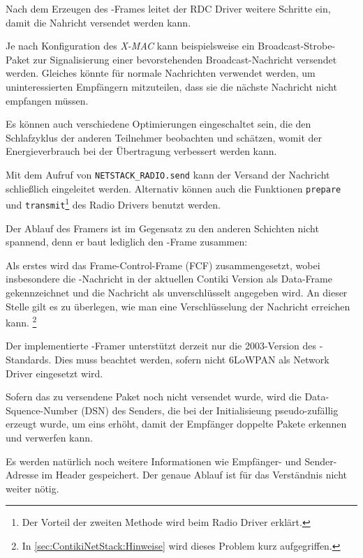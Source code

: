 \medskip

	Nach dem Erzeugen des \ieeeframe-Frames leitet der RDC Driver weitere
	Schritte ein, damit die Nahricht versendet werden kann.

	Je nach Konfiguration des \emph{X-MAC} kann beispielsweise ein
	Broadcast-Strobe-Paket zur Signalisierung einer bevorstehenden
	Broadcast-Nachricht versendet werden.  Gleiches könnte für normale
	Nachrichten verwendet werden, um uninteressierten Empfängern
	mitzuteilen, dass sie die nächste Nachricht nicht empfangen müssen.

	Es können auch verschiedene Optimierungen eingeschaltet sein, die den
	Schlafzyklus der anderen Teilnehmer beobachten und schätzen, womit der
	Energieverbrauch bei der Übertragung verbessert werden kann.

\medskip

	Mit dem Aufruf von \lstinline=NETSTACK_RADIO.send= kann der Versand der
	Nachricht schließlich eingeleitet werden.  Alternativ können auch die
	Funktionen \lstinline=prepare= und \lstinline=transmit=\footnote{Der Vorteil der
	zweiten Methode wird beim Radio Driver erklärt.} des Radio Drivers
	benutzt werden.

	Der Ablauf des Framers ist im Gegensatz zu den anderen Schichten nicht
	spannend, denn er baut lediglich den \ieeeframe-Frame zusammen:

	Als erstes wird das Frame-Control-Frame (FCF) zusammengesetzt, wobei
	insbesondere die \ieeeframe-Nachricht in der aktuellen Contiki Version
	als Data-Frame gekennzeichnet und die Nachricht als unverschlüsselt
	angegeben wird. An dieser Stelle gilt es zu überlegen, wie man eine
	Verschlüsselung der Nachricht erreichen kann.  \footnote{In
	\autoref{sec:ContikiNetStack:Hinweise} wird dieses Problem kurz
	aufgegriffen.}

	Der implementierte \ieeeframe-Framer unterstützt derzeit nur die
	2003-Version des \ieeeframe-Standards. Dies muss beachtet werden,
	sofern nicht \acs{6LoWPAN} als Network Driver eingesetzt wird.

	Sofern das zu versendene Paket noch nicht versendet wurde, wird die
	Data-Squence-Number (DSN) des Senders, die bei der Initialisieung
	pseudo-zufällig erzeugt wurde, um eins erhöht, damit der Empfänger
	doppelte Pakete erkennen und verwerfen kann.

	Es werden natürlich noch weitere Informationen wie Empfänger- und
	Sender-Adresse im Header gespeichert. Der genaue Ablauf ist für das
	Verständnis nicht weiter nötig.


